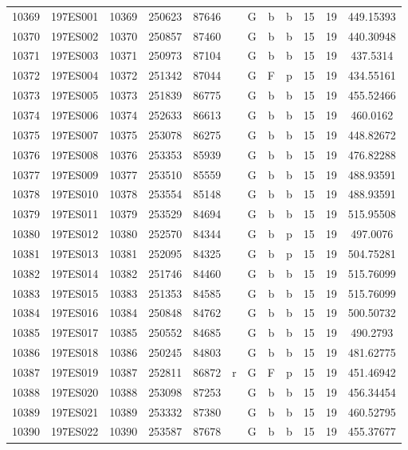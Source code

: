 \begin{tabular}{|*{12}{c|}}
10369 & 197ES001 & 10369 & 250623 & 87646 &  & G & b & b & 15 & 19 & 449.15393 \\ 
10370 & 197ES002 & 10370 & 250857 & 87460 &  & G & b & b & 15 & 19 & 440.30948 \\ 
10371 & 197ES003 & 10371 & 250973 & 87104 &  & G & b & b & 15 & 19 & 437.5314 \\ 
10372 & 197ES004 & 10372 & 251342 & 87044 &  & G & F & p & 15 & 19 & 434.55161 \\ 
10373 & 197ES005 & 10373 & 251839 & 86775 &  & G & b & b & 15 & 19 & 455.52466 \\ 
10374 & 197ES006 & 10374 & 252633 & 86613 &  & G & b & b & 15 & 19 & 460.0162 \\ 
10375 & 197ES007 & 10375 & 253078 & 86275 &  & G & b & b & 15 & 19 & 448.82672 \\ 
10376 & 197ES008 & 10376 & 253353 & 85939 &  & G & b & b & 15 & 19 & 476.82288 \\ 
10377 & 197ES009 & 10377 & 253510 & 85559 &  & G & b & b & 15 & 19 & 488.93591 \\ 
10378 & 197ES010 & 10378 & 253554 & 85148 &  & G & b & b & 15 & 19 & 488.93591 \\ 
10379 & 197ES011 & 10379 & 253529 & 84694 &  & G & b & b & 15 & 19 & 515.95508 \\ 
10380 & 197ES012 & 10380 & 252570 & 84344 &  & G & b & p & 15 & 19 & 497.0076 \\ 
10381 & 197ES013 & 10381 & 252095 & 84325 &  & G & b & p & 15 & 19 & 504.75281 \\ 
10382 & 197ES014 & 10382 & 251746 & 84460 &  & G & b & b & 15 & 19 & 515.76099 \\ 
10383 & 197ES015 & 10383 & 251353 & 84585 &  & G & b & b & 15 & 19 & 515.76099 \\ 
10384 & 197ES016 & 10384 & 250848 & 84762 &  & G & b & b & 15 & 19 & 500.50732 \\ 
10385 & 197ES017 & 10385 & 250552 & 84685 &  & G & b & b & 15 & 19 & 490.2793 \\ 
10386 & 197ES018 & 10386 & 250245 & 84803 &  & G & b & b & 15 & 19 & 481.62775 \\ 
10387 & 197ES019 & 10387 & 252811 & 86872 & r & G & F & p & 15 & 19 & 451.46942 \\ 
10388 & 197ES020 & 10388 & 253098 & 87253 &  & G & b & b & 15 & 19 & 456.34454 \\ 
10389 & 197ES021 & 10389 & 253332 & 87380 &  & G & b & b & 15 & 19 & 460.52795 \\ 
10390 & 197ES022 & 10390 & 253587 & 87678 &  & G & b & b & 15 & 19 & 455.37677 \\ 

\end{tabular}
